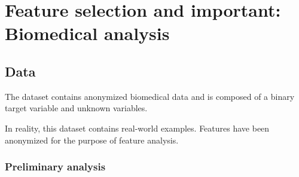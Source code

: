 \chapter{Feature selection and important: Biomedical analysis}


\section{Data}

The dataset contains anonymized biomedical data and is composed of a binary target variable and unknown variables.

\begin{remark}
    In reality, this dataset contains real-world examples. Features have been anonymized for the purpose of feature analysis.
\end{remark}


\subsection{Preliminary analysis}

